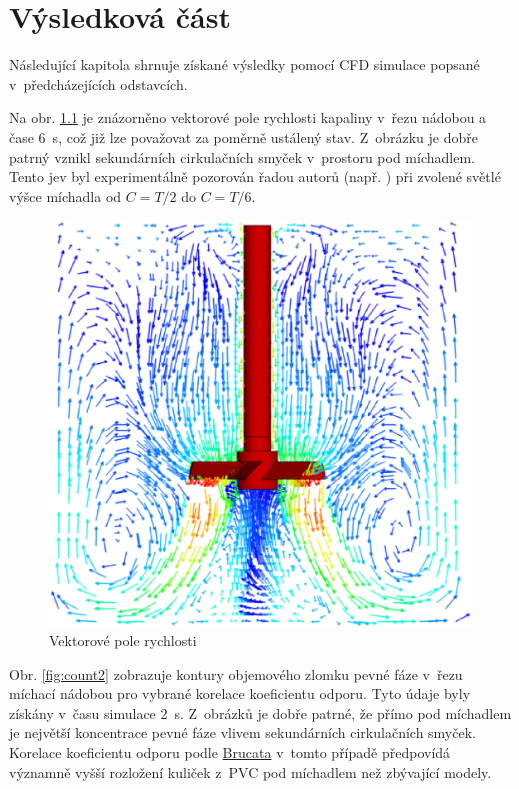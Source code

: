 \chapter{Výsledková část}
Následující kapitola shrnuje získané výsledky pomocí CFD simulace popsané v~předcházejících odstavcích. 

Na obr. \ref{fig:vecfield} je znázorněno vektorové pole rychlosti kapaliny v~řezu nádobou a čase \SI{6}{\second}, což již lze považovat za poměrně ustálený stav. Z~obrázku je dobře patrný vznikl sekundárních cirkulačních smyček v~prostoru pod míchadlem. Tento jev byl experimentálně pozorován řadou autorů (např. \citet{hos10}) při zvolené světlé výšce míchadla od $C=T/2$ do $C=T/6$.  

\begin{figure}[h!]
\begin{center}
\includegraphics[scale=0.45]{images/vecfield.eps}
\caption{Vektorové pole rychlosti}
\label{fig:vecfield}
\end{center}
\end{figure} 

\vspace{-12mm}
\newpage

Obr. \ref{fig:count2} zobrazuje kontury objemového zlomku pevné fáze v~řezu míchací nádobou pro vybrané korelace koeficientu odporu. Tyto údaje byly získány v~času simulace \SI{2}{\second}. Z~obrázků je dobře patrné, že přímo pod míchadlem je největší koncentrace pevné fáze vlivem sekundárních cirkulačních smyček. Korelace koeficientu odporu podle \hyperlink{hyp:cds}{Brucata} v~tomto případě předpovídá významně vyšší rozložení kuliček z~PVC pod míchadlem než zbývající modely.

